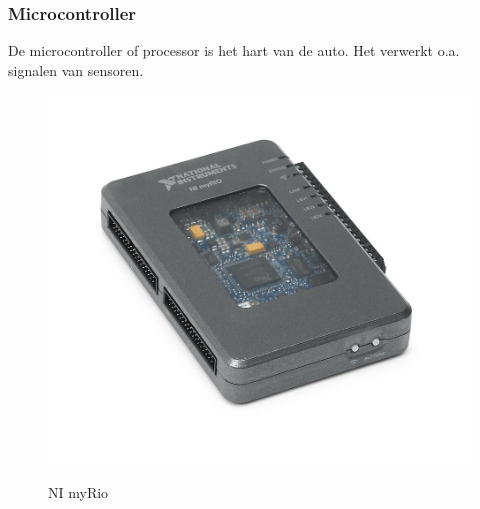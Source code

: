 \documentclass
   [kulak] %
   {kulakbeamer}
\begin{document}
\begin{frame}
	\frametitle{Microcontroller}
	De microcontroller of processor is het hart van de auto. Het verwerkt o.a. signalen van sensoren.
		\begin{figure}
			\centering
			\includegraphics[width=.45\textwidth]{NI-myrio}
			\caption{NI myRio}\cite{nimyrio}
		\end{figure}
\end{frame}
\end{document}
